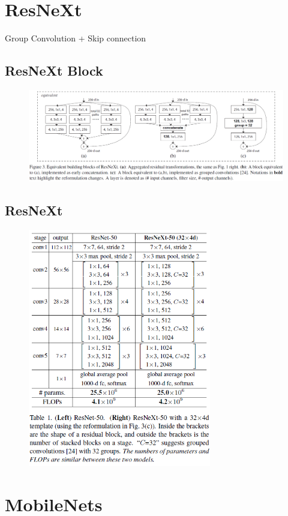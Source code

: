 \section{ResNeXt}
Group Convolution + Skip connection

\subsection{ResNeXt Block}
\begin{figure}[H]
    \centering
    \includegraphics[width=16cm]{images/models/resnext_blocks.png}
    \label{fig:resnext_blocks}
\end{figure}

\subsection{ResNeXt}
\begin{figure}[H]
    \centering
    \includegraphics[width=8cm]{images/models/resnext.png}
    \label{fig:resnext}
\end{figure}

\section{MobileNets}

